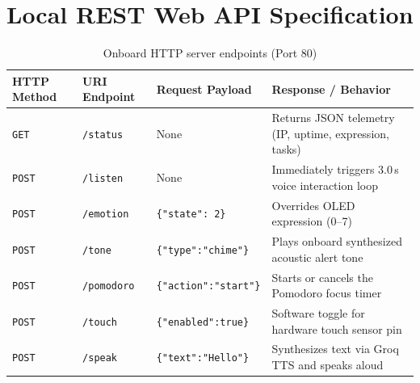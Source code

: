 \documentclass[11pt,a4paper,oneside]{report}
\newcommand{\hdr}[1]{\cellcolor{LightBlue}\textbf{#1}}
\begin{document}
\chapter{Local REST Web API Specification}
\begin{table}[H]\centering\small
\caption{Onboard HTTP server endpoints (Port 80)}
\begin{tabularx}{\linewidth}{|l|l|l|X|}\hline
\hdr{HTTP Method} & \hdr{URI Endpoint} & \hdr{Request Payload} & \hdr{Response / Behavior}\\ \hline
\texttt{GET} & \texttt{/status} & None & Returns JSON telemetry (IP, uptime, expression, tasks) \\ \hline
\texttt{POST} & \texttt{/listen} & None & Immediately triggers 3.0\,s voice interaction loop \\ \hline
\texttt{POST} & \texttt{/emotion} & \texttt{\{"state": 2\}} & Overrides OLED expression (0--7) \\ \hline
\texttt{POST} & \texttt{/tone} & \texttt{\{"type":"chime"\}} & Plays onboard synthesized acoustic alert tone \\ \hline
\texttt{POST} & \texttt{/pomodoro} & \texttt{\{"action":"start"\}} & Starts or cancels the Pomodoro focus timer \\ \hline
\texttt{POST} & \texttt{/touch} & \texttt{\{"enabled":true\}} & Software toggle for hardware touch sensor pin \\ \hline
\texttt{POST} & \texttt{/speak} & \texttt{\{"text":"Hello"\}} & Synthesizes text via Groq TTS and speaks aloud \\ \hline
\end{tabularx}
\end{table}
\end{document}
